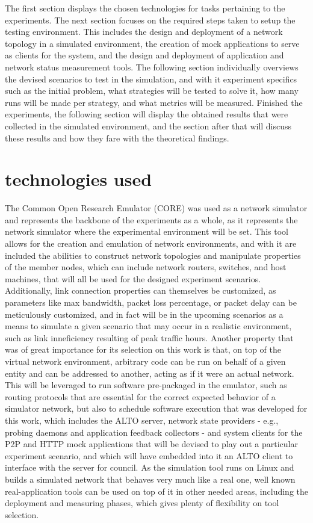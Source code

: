     The first section displays the chosen technologies for tasks pertaining to the experiments.
    The next section focuses on the required steps taken to setup the testing environment.
    This includes the design and deployment of a network topology in a simulated environment, the creation of mock applications to serve as clients for the system, and the design and deployment of application and network status measurement tools.
    The following section individually overviews the devised scenarios to test in the simulation, and with it experiment specifics such as the initial problem, what strategies will be tested to solve it, how many runs will be made per strategy, and what metrics will be measured.
    Finished the experiments, the following section will display the obtained results that were collected in the simulated environment, and the section after that will discuss these results and how they fare with the theoretical findings.

\section{technologies used}

    The Common Open Research Emulator (CORE) \cite{core} was used as a network simulator and represents the backbone of the experiments as a whole, as it represents the network simulator where the experimental environment will be set.
    This tool allows for the creation and emulation of network environments, and with it are included the abilities to construct network topologies and manipulate properties of the member nodes, which can include network routers, switches, and host machines, that will all be used for the designed experiment scenarios.
    Additionally, link connection properties can themselves be customized, as parameters like max bandwidth, packet loss percentage, or packet delay can be meticulously customized, and in fact will be in the upcoming scenarios as a means to simulate a given scenario that may occur in a realistic environment, such as link inneficiency resulting of peak traffic hours.
    Another property that was of great importance for its selection on this work is that, on top of the virtual network environment, arbitrary code can be run on behalf of a given entity and can be addressed to another, acting as if it were an actual network.
    This will be leveraged to run software pre-packaged in the emulator, such as routing protocols that are essential for the correct expected behavior of a simulator network, but also to schedule software execution that was developed for this work, which includes the ALTO server, network state providers - e.g., probing daemons and application feedback collectors - and system clients for the P2P and HTTP mock applications that will be devised to play out a particular experiment scenario, and which will have embedded into it an ALTO client to interface with the server for council.
    As the simulation tool runs on Linux and builds a simulated network that behaves very much like a real one, well known real-application tools can be used on top of it in other needed areas, including the deployment and measuring phases, which gives plenty of flexibility on tool selection.

